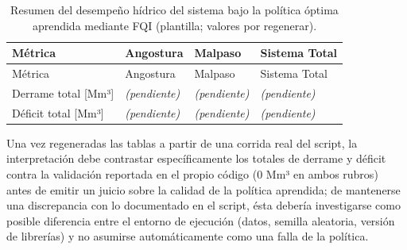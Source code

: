 \documentclass[
  spanish,
  letterpaper,
]{scrreprt}
\theoremstyle{definition}
\theoremstyle{remark}
\begin{document}
\begin{longtable}[]{@{}
  >{\raggedright\arraybackslash}p{}
  >{\raggedright\arraybackslash}p{}
  >{\raggedright\arraybackslash}p{}
  >{\raggedright\arraybackslash}p{}@{}}
\caption{Resumen del desempeño hídrico del sistema bajo la política
óptima aprendida mediante FQI (plantilla; valores por
regenerar).}\tabularnewline
\toprule\noalign{}
\begin{minipage}[b]{\linewidth}\raggedright
Métrica
\end{minipage} & \begin{minipage}[b]{\linewidth}\raggedright
Angostura
\end{minipage} & \begin{minipage}[b]{\linewidth}\raggedright
Malpaso
\end{minipage} & \begin{minipage}[b]{\linewidth}\raggedright
Sistema Total
\end{minipage} \\
\midrule\noalign{}
\endfirsthead
\toprule\noalign{}
\begin{minipage}[b]{\linewidth}\raggedright
Métrica
\end{minipage} & \begin{minipage}[b]{\linewidth}\raggedright
Angostura
\end{minipage} & \begin{minipage}[b]{\linewidth}\raggedright
Malpaso
\end{minipage} & \begin{minipage}[b]{\linewidth}\raggedright
Sistema Total
\end{minipage} \\
\midrule\noalign{}
\endhead
\bottomrule\noalign{}
\endlastfoot
Derrame total {[}Mm³{]} & \emph{(pendiente)} & \emph{(pendiente)} &
\emph{(pendiente)} \\
Déficit total {[}Mm³{]} & \emph{(pendiente)} & \emph{(pendiente)} &
\emph{(pendiente)} \\
\end{longtable}

Una vez regeneradas las tablas a partir de una corrida real del script,
la interpretación debe contrastar específicamente los totales de derrame
y déficit contra la validación reportada en el propio código (0 Mm³ en
ambos rubros) antes de emitir un juicio sobre la calidad de la política
aprendida; de mantenerse una discrepancia con lo documentado en el
script, ésta debería investigarse como posible diferencia entre el
entorno de ejecución (datos, semilla aleatoria, versión de librerías) y
no asumirse automáticamente como una falla de la política.
\end{document}
